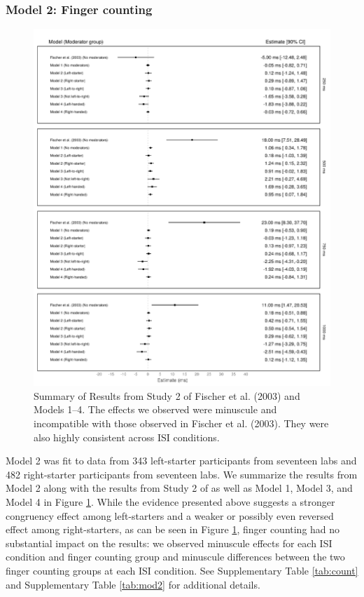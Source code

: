 \documentclass[A4paper,man,floatsintext]{apa6}
\theoremstyle{definition}
\theoremstyle{definition}
\theoremstyle{definition}
\theoremstyle{remark}
\begin{document}
\subsubsection{Model 2: Finger
counting}\label{model-2-finger-counting-1}

\begin{figure}
\includegraphics[width=\textwidth]{meta_summaryv4} \caption{Summary of Results from Study 2 of Fischer et al. (2003)
and Models 1--4. The effects we observed were minuscule and incompatible
with those observed in Fischer et al. (2003). They were also highly
consistent across ISI conditions.}\label{fig:metasum}
\end{figure}

Model 2 was fit to data from 343 left-starter participants from
seventeen labs and 482 right-starter participants from seventeen labs.
We summarize the results from Model 2 along with the results from Study
2 of \textcite{Fischer:2003ju} as well as Model 1, Model 3, and Model 4
in Figure \ref{fig:metasum}. While the evidence presented above suggests
a stronger congruency effect among left-starters and a weaker or
possibly even reversed effect among right-starters, as can be seen in
Figure \ref{fig:metasum}, finger counting had no substantial impact on
the results: we observed minuscule effects for each ISI condition and
finger counting group and minuscule differences between the two finger
counting groups at each ISI condition. See Supplementary Table
\ref{tab:count} and Supplementary Table \ref{tab:mod2} for additional
details.
\end{document}
